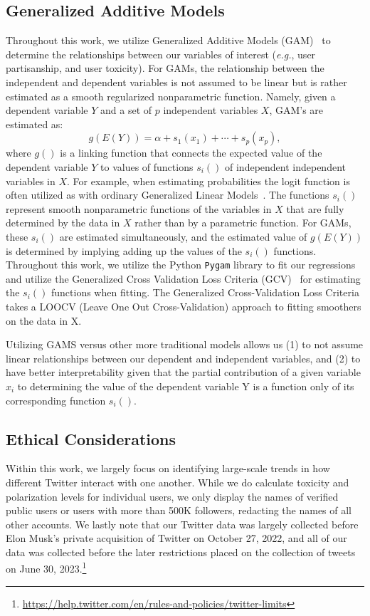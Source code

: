 \subsection{Generalized Additive Models}
Throughout this work, we utilize Generalized Additive Models (GAM)~\cite{hastie2017generalized} to determine the relationships between our variables of interest (\textit{e.g.}, user partisanship, and user toxicity). For GAMs, the relationship between the independent and dependent variables is not assumed to be linear but is rather estimated as a smooth regularized nonparametric function. Namely, given a dependent variable $Y$ and a set of $p$ independent variables  $X$, GAM's are estimated as:
\begin{equation}
    g(E(Y))=\alpha+s_1(x_1)+\cdots+s_p(x_p),
\end{equation} where $g()$ is a linking function that connects the expected value of the dependent variable $Y$ to values of functions $s_i()$ of independent independent variables in $X$. For example, when estimating probabilities the logit function is often utilized as with ordinary Generalized Linear Models~\cite{demaris1992logit}. The functions $s_i()$ represent smooth nonparametric functions of the variables in $X$ that are fully determined by the data in $X$ rather than by a parametric function. For GAMs, these $s_i()$ are estimated simultaneously, and the estimated value of $g(E(Y))$ is determined by implying adding up the values of the $s_i()$ functions. Throughout this work, we utilize the Python \texttt{Pygam} library to fit our regressions and utilize the Generalized Cross Validation Loss Criteria (GCV)~\cite{demaris1992logit} for estimating the $s_i()$ functions when fitting. The Generalized Cross-Validation Loss Criteria takes a LOOCV (Leave One Out Cross-Validation) approach to fitting smoothers on the data in X. 

Utilizing GAMS versus other more traditional models allows us  (1) to not assume linear relationships between our dependent and independent variables, and (2) to have better interpretability given that the partial contribution of a given variable $x_i$ to determining the value of the dependent variable Y is a function only of its corresponding function $s_i()$. 

\subsection{Ethical Considerations} 
Within this work, we largely focus on identifying large-scale trends in how different Twitter interact with one another. While we do calculate toxicity and polarization levels for individual users, we only display the names of verified public users or users with more than 500K followers, redacting the names of all other accounts. 
We lastly note that our Twitter data was largely collected before Elon Musk's private acquisition of Twitter on October 27, 2022, and all of our data was collected before the later restrictions placed on the collection of tweets on June 30, 2023.\footnote{\url{https://help.twitter.com/en/rules-and-policies/twitter-limits}}


